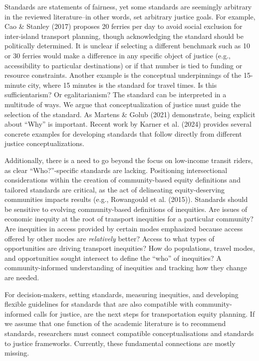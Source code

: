 \documentclass[
  letterpaper,
  DIV=11,
  numbers=noendperiod]{scrartcl}
\begin{document}
Standards are statements of fairness, yet some standards are seemingly
arbitrary in the reviewed literature--in other words, set arbitrary
justice goals. For example, Cao \& Stanley (2017) proposes 20 ferries
per day to avoid social exclusion for inter-island transport planning,
though acknowledging the standard should be politically determined. It
is unclear if selecting a different benchmark such as 10 or 30 ferries
would make a difference in any specific object of justice (e.g.,
accessibility to particular destinations) or if that number is tied to
funding or resource constraints. Another example is the conceptual
underpinnings of the 15-minute city, where 15 minutes is the standard
for travel times. Is this sufficientarism? Or egalitarianism? The
standard can be interpreted in a multitude of ways. We argue that
conceptualization of justice must guide the selection of the standard.
As Martens \& Golub (2021) demonstrate, being explicit about ``Why'' is
important. Recent work by Karner et al. (2024) provides several concrete
examples for developing standards that follow directly from different
justice conceptualizations.

Additionally, there is a need to go beyond the focus on low-income
transit riders, as clear ``Who?''-specific standards are lacking.
Positioning intersectional considerations within the creation of
community-based equity definitions and tailored standards are critical,
as the act of delineating equity-deserving communities impacts results
(e.g., Rowangould et al. (2015)). Standards should be sensitive to
evolving community-based definitions of inequities. Are issues of
economic inequity at the root of transport inequities for a particular
community? Are inequities in access provided by certain modes emphasized
because access offered by other modes are \emph{relatively} better?
Access to what types of opportunities are driving transport inequities?
How do populations, travel modes, and opportunities sought intersect to
define the ``who'' of inequities? A community-informed understanding of
inequities and tracking how they change are needed.

For decision-makers, setting standards, measuring inequities, and
developing flexible guidelines for standards that are also compatible
with community-informed calls for justice, are the next steps for
transportation equity planning. If we assume that one function of the
academic literature is to recommend standards, researchers must connect
compatible conceptualisations and standards to justice frameworks.
Currently, these fundamental connections are mostly missing.
\end{document}
